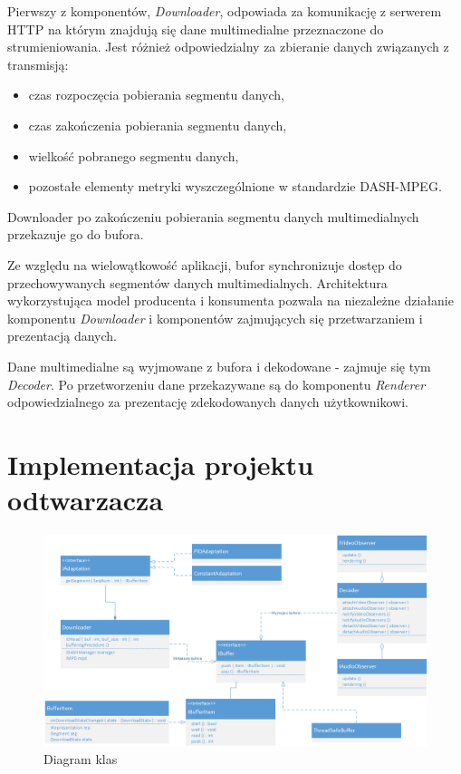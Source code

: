 Pierwszy z komponentów, \textit{Downloader}, odpowiada za komunikację z serwerem HTTP na którym znajdują się dane multimedialne przeznaczone do strumieniowania. Jest różnież odpowiedzialny za zbieranie danych związanych z transmisją:
\begin{itemize}
\item czas rozpoczęcia pobierania segmentu danych,
\item czas zakończenia pobierania segmentu danych,
\item wielkość pobranego segmentu danych,
\item pozostałe elementy metryki wyszczególnione w standardzie DASH-MPEG.
\end{itemize}
Downloader po zakończeniu pobierania segmentu danych multimedialnych przekazuje go do bufora. 

Ze względu na wielowątkowość aplikacji, bufor synchronizuje dostęp do 
przechowywanych segmentów danych multimedialnych. Architektura wykorzystująca model producenta i konsumenta pozwala na niezależne działanie komponentu \textit{Downloader} i komponentów zajmujących się przetwarzaniem i prezentacją danych. 

Dane multimedialne są wyjmowane z bufora i dekodowane - zajmuje się tym \textit{Decoder}. Po przetworzeniu dane przekazywane są do komponentu \textit{Renderer} odpowiedzialnego za prezentację zdekodowanych danych użytkownikowi.

\section{Implementacja projektu odtwarzacza}

\begin{figure}
	\centering
		\includegraphics[scale=0.8]{Class}
	\caption{Diagram klas}
	\label{fig:Class}
\end{figure}

